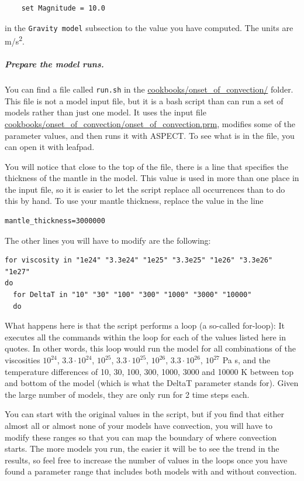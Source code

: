 \begin{verbatim}
    set Magnitude = 10.0
\end{verbatim}

in the \texttt{Gravity model} subsection to the value you have computed. The units are m/s\textsuperscript{2}. 

\subparagraph{Prepare the model runs.}

You can find a file called \texttt{run.sh} in the \url{cookbooks/onset_of_convection/} folder. 
This file is not a model input file, but it is a bash script than can run a set of models rather than just one model. 
It uses the input file \url{cookbooks/onset_of_convection/onset_of_convection.prm}, modifies some of the parameter values, 
and then runs it with ASPECT. To see what is in the file, you can open it with leafpad. 

You will notice that close to the top of the file, there is a line that specifies the thickness of the mantle in the model. 
This value is used in more than one place in the input file, so it is easier to let the script replace all occurrences than to do this by hand. To use your mantle thickness, replace the value in the line 

\begin{verbatim}
mantle_thickness=3000000
\end{verbatim}

The other lines you will have to modify are the following:

\begin{verbatim}
for viscosity in "1e24" "3.3e24" "1e25" "3.3e25" "1e26" "3.3e26" "1e27"
do
  for DeltaT in "10" "30" "100" "300" "1000" "3000" "10000"
  do   
\end{verbatim}

What happens here is that the script performs a loop (a so-called for-loop):
It executes all the commands within the loop for each of the values listed here in quotes. 
In other words, this loop would run the model for all combinations of the viscosities $10^{24}$, $3.3 \cdot 10^{24}$, $10^{25}$, $3.3 \cdot 10^{25}$, $10^{26}$, $3.3 \cdot 10^{26}$, $10^{27}$ Pa s, and the temperature differences of 10, 30, 100, 300, 1000, 3000 and 10000 K between top and bottom of the model (which is what the DeltaT parameter stands for). 
Given the large number of models, they are only run for 2 time steps each. 

You can start with the original values in the script, but if you find that either almost all or almost none of your models have convection, you will have to modify these ranges so that you can map the boundary of where convection starts. 
The more models you run, the easier it will be to see the trend in the results, so feel free to increase the number of values in the loops once you have found a parameter range that includes both models with and without convection.  

